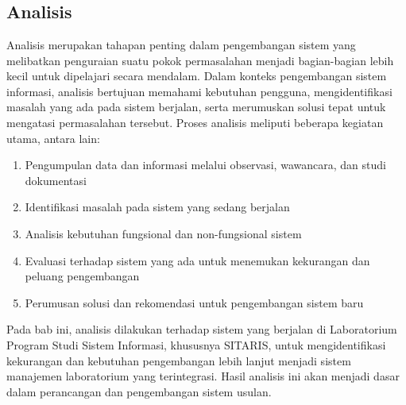 %
%
%
%


\chapter{\babEmpat}
\thispagestyle{fancy} %
\section{Analisis}
Analisis merupakan tahapan penting dalam pengembangan sistem yang melibatkan penguraian suatu pokok permasalahan menjadi bagian-bagian lebih kecil untuk dipelajari secara mendalam. Dalam konteks pengembangan sistem informasi, analisis bertujuan memahami kebutuhan pengguna, mengidentifikasi masalah yang ada pada sistem berjalan, serta merumuskan solusi tepat untuk mengatasi permasalahan tersebut. Proses analisis meliputi beberapa kegiatan utama, antara lain:
\begin{enumerate}
	\item Pengumpulan data dan informasi melalui observasi, wawancara, dan studi dokumentasi
	\item Identifikasi masalah pada sistem yang sedang berjalan
	\item Analisis kebutuhan fungsional dan non-fungsional sistem
	\item Evaluasi terhadap sistem yang ada untuk menemukan kekurangan dan peluang pengembangan
	\item Perumusan solusi dan rekomendasi untuk pengembangan sistem baru
\end{enumerate}

Pada bab ini, analisis dilakukan terhadap sistem yang berjalan di Laboratorium Program Studi Sistem Informasi, khususnya SITARIS, untuk mengidentifikasi kekurangan dan kebutuhan pengembangan lebih lanjut menjadi sistem manajemen laboratorium yang terintegrasi. Hasil analisis ini akan menjadi dasar dalam perancangan dan pengembangan sistem usulan.

